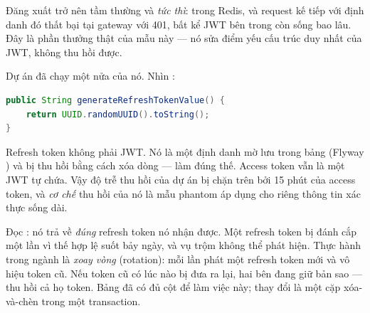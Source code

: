 Đăng xuất trở nên tầm thường và \emph{tức thì}:  trong
Redis, và request kế tiếp với định danh đó thất bại tại gateway với 401,
bất kể JWT bên trong còn sống bao lâu. Đây là phần thưởng thật của mẫu
này --- nó sửa điểm yếu cấu trúc duy nhất của JWT, không thu hồi được.

Dự án đã chạy một nửa của nó. Nhìn
:

\begin{lstlisting}[language=Java]
public String generateRefreshTokenValue() {
    return UUID.randomUUID().toString();
}
\end{lstlisting}

Refresh token không phải JWT. Nó là một định danh mờ lưu trong bảng
 (Flyway ) và bị thu hồi bằng cách xóa
dòng ---  làm đúng thế. Access token vẫn là
một JWT tự chứa. Vậy độ trễ thu hồi của dự án bị chặn trên bởi 15 phút
của access token, và \emph{cơ chế} thu hồi của nó là mẫu phantom áp dụng
cho riêng thông tin xác thực sống dài.

\begin{pitfall}
Đọc : nó trả về \emph{đúng} refresh
token nó nhận được. Một refresh token bị đánh cắp một lần vì thế hợp lệ
suốt bảy ngày, và vụ trộm không thể phát hiện. Thực hành trong ngành là
\emph{xoay vòng} (rotation): mỗi lần  phát một refresh
token mới và vô hiệu token cũ. Nếu token cũ có lúc nào bị đưa ra lại,
hai bên đang giữ bản sao --- thu hồi cả họ token. Bảng đã có đủ cột để
làm việc này; thay đổi là một cặp xóa-và-chèn trong một transaction.
\end{pitfall}

